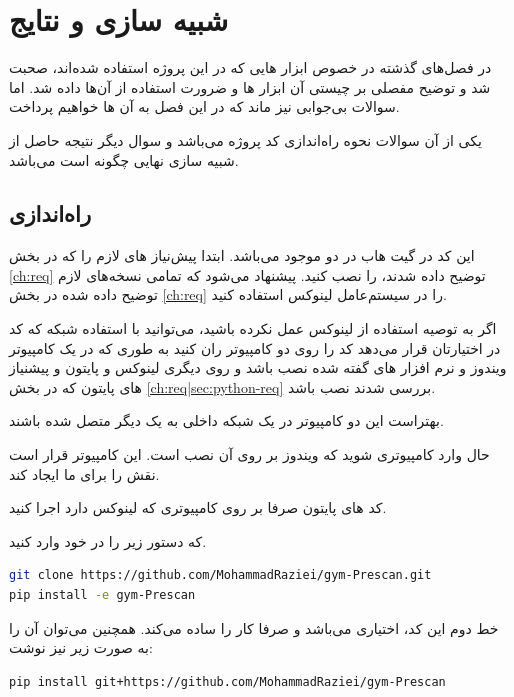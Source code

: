 \chapter{شبیه سازی و نتایج}\label{ch:resault}
در فصل‌های گذشته در خصوص ابزار هایی که در این پروژه استفاده شده‌اند، صحبت شد و توضیح مفصلی بر چیستی آن ابزار ها و ضرورت استفاده از آن‌ها داده شد. اما سوالات بی‌جوابی نیز ماند که در این فصل به آن ها خواهیم پرداخت.

یکی از آن سوالات نحوه راه‌اندازی کد پروژه می‌باشد و سوال دیگر نتیجه حاصل از شبیه سازی نهایی چگونه است می‌باشد.
\section{راه‌اندازی}\label{ch:resault|sec:launch}
این کد در گیت هاب در دو 
موجود می‌باشد. ابتدا پیش‌نیاز های لازم را که در بخش
\ref{ch:req}
توضیح داده شدند، را نصب کنید. پیشنهاد می‌شود که تمامی نسخه‌های لازم توضیح داده شده در بخش \ref{ch:req} را در سیستم‌عامل لینوکس استفاده کنید. 

اگر به توصیه استفاده از لینوکس عمل نکرده باشید، می‌توانید با استفاده شبکه که کد در اختیارتان قرار می‌دهد کد را روی دو کامپیوتر ران کنید به طوری که در یک کامپیوتر ویندوز و نرم افزار های گفته شده نصب باشد و روی دیگری لینوکس و پایتون و پیشنیاز های پایتون که در بخش 
\ref{ch:req|sec:python-req}
بررسی شدند نصب باشد. 
\begin{note}
بهتراست این دو کامپیوتر در یک شبکه داخلی به یک دیگر متصل شده باشند.
\end{note}

حال وارد کامپیوتری شوید که ویندوز بر روی آن نصب است. این کامپیوتر قرار است نقش 
را برای ما ایجاد کند. 
\begin{note}
	کد های پایتون صرفا بر روی کامپیوتری که لینوکس دارد اجرا کنید.
\end{note}
 که دستور زیر را در  خود وارد کنید.

\begin{latin}
\begin{lstlisting}[language=bash]
git clone https://github.com/MohammadRaziei/gym-Prescan.git
pip install -e gym-Prescan
\end{lstlisting}
\end{latin}

خط دوم این کد، اختیاری می‌باشد و صرفا کار را ساده می‌کند. همچنین می‌توان آن را به صورت زیر نیز نوشت:

\begin{latin}
\begin{lstlisting}[language=bash]
pip install git+https://github.com/MohammadRaziei/gym-Prescan
\end{lstlisting}
\end{latin}

